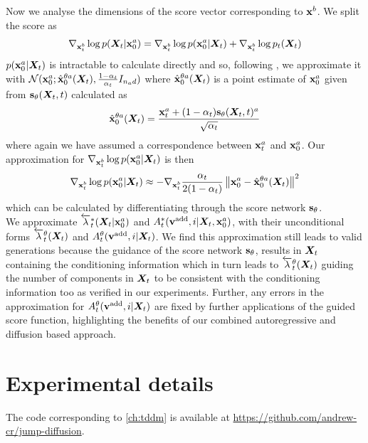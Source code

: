 Now we analyse the dimensions of the score vector corresponding to ${\mathbf{x}}^b$. We split the score as
\begin{equation}
    \nabla_{{\mathbf{x}}_t^b} \log p({\bm{X}}_t | {\mathbf{x}}_0^a) = \nabla_{{\mathbf{x}}_t^b} \log p({\mathbf{x}}_0^a | {\bm{X}}_t) + \nabla_{{\mathbf{x}}_t^b} \log p_t({\bm{X}}_t)
    \label{eq:condScoreSplit}
\end{equation}
$p({\mathbf{x}}_0^a | {\bm{X}}_t)$ is intractable to calculate directly and so, following \citet{ho2022video}, we approximate it with $\mathcal{N}({\mathbf{x}}_0^a ; \hat{{\mathbf{x}}}_0^{\theta a}({\bm{X}}_t), \frac{1 - \alpha_t}{\alpha_t} I_{n_a d})$ where $\hat{{\mathbf{x}}}_0^{\theta a}({\bm{X}}_t)$ is a point estimate of ${\mathbf{x}}_0^a$ given from ${\mathbf{s}}_\theta({\bm{X}}_t, t)$ calculated as 
\begin{equation}
    \hat{{\mathbf{x}}}_0^{\theta a}({\bm{X}}_t) = \frac{{\mathbf{x}}_t^a + (1 - \alpha_t) {\mathbf{s}}_\theta({\bm{X}}_t, t)^a}{\sqrt{\alpha_t}}
\end{equation}
where again we have assumed a correspondence between ${\mathbf{x}}_t^a$ and ${\mathbf{x}}_0^a$. Our approximation for $\nabla_{{\mathbf{x}}_t^b} \log p({\mathbf{x}}_0^a | {\bm{X}}_t)$ is then
\begin{equation}
    \nabla_{{\mathbf{x}}_t^b} \log p({\mathbf{x}}_0^a | {\bm{X}}_t) \approx - \nabla_{{\mathbf{x}}_t^b} \frac{\alpha_t}{2 ( 1- \alpha_t)} \left\lVert{\mathbf{x}}_0^a - \hat{{\mathbf{x}}}_0^{\theta a}({\bm{X}}_t) \right\rVert^2
\end{equation}
which can be calculated by differentiating through the score network ${\mathbf{s}}_\theta$. \\

We approximate $\overleftarrow{\lambda}_t^*({\bm{X}}_t | {\mathbf{x}}_0^a)$ and $A_t^*({\mathbf{v}}^{\textup{add}}, i | {\bm{X}}_t, {\mathbf{x}}_0^a)$, with their unconditional forms $\overleftarrow{\lambda}_t^\theta({\bm{X}}_t)$ and $A_t^\theta({\mathbf{v}}^{\textup{add}}, i | {\bm{X}}_t)$. We find this approximation still leads to valid generations because the guidance of the score network ${\mathbf{s}}_\theta$, results in ${\bm{X}}_t$ containing the conditioning information which in turn leads to $\overleftarrow{\lambda}_t^\theta({\bm{X}}_t)$ guiding the number of components in ${\bm{X}}_t$ to be consistent with the conditioning information too as verified in our experiments. Further, any errors in the approximation for $A_t^\theta({\mathbf{v}}^{\textup{add}}, i | {\bm{X}}_t)$ are fixed by further applications of the guided score function, highlighting the benefits of our combined autoregressive and diffusion based approach.







\section{Experimental details}
\label{sec:tddm-ExperimentDetails}
The code corresponding to \cref{ch:tddm} is available at \url{https://github.com/andrew-cr/jump-diffusion}.

